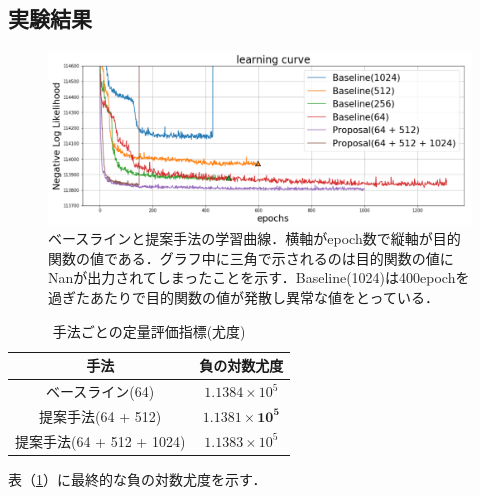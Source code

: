 \documentclass[10pt, twocolumn]{jarticle}
\begin{document}
\subsection{実験結果}


\begin{figure}[h]
    \begin{center}
        \includegraphics[width=\linewidth]{./figures/curve_yoko.png}
        \caption[提案手法の学習曲線]{\small ベースラインと提案手法の学習曲線．横軸がepoch数で縦軸が目的関数の値である．グラフ中に三角で示されるのは目的関数の値にNanが出力されてしまったことを示す．Baseline(1024)は400epochを過ぎたあたりで目的関数の値が発散し異常な値をとっている．}
        \label{fig:curve}
    \end{center}
    \end{figure}
\normalsize

\begin{table}[h]
    \begin{center}
    \caption{\small 手法ごとの定量評価指標(尤度)}
    \begin{tabular}{|c||c|} \hline
      \small 手法 & \small 負の対数尤度 \\ \hline \hline
      \small ベースライン(64) & \small $1.1384 \times 10^5 $ \\ \hline
      \small 提案手法(64 + 512) & \small $\bm{1.1381 \times 10^5 }$ \\ \hline
      \small 提案手法(64 + 512 + 1024) & \small $1.1383 \times 10^5$ \\ \hline
    \end{tabular}
    \label{table:evaluation}
    \end{center}
  \end{table}
\normalsize

表（\ref{table:evaluation}）に最終的な負の対数尤度を示す．
\end{document}
